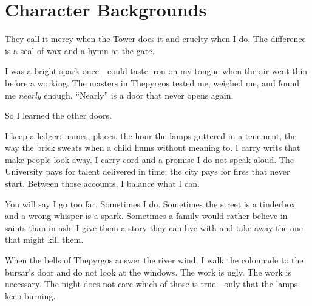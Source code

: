 \chapter{Character Backgrounds}
\label{ch:backgrounds}

\begin{tcolorbox}[colback=black!3!white,colframe=black!60!white,title={From the journal of a Thepyrgosi Witch Hunter},fonttitle=\bfseries]
They call it mercy when the Tower does it and cruelty when I do. The difference is a seal of wax and a hymn at the gate.

I was a bright spark once—could taste iron on my tongue when the air went thin before a working. The masters in Thepyrgos tested me, weighed me, and found me \emph{nearly} enough. ``Nearly'' is a door that never opens again.

So I learned the other doors.

I keep a ledger: names, places, the hour the lamps guttered in a tenement, the way the brick sweats when a child hums without meaning to. I carry writs that make people look away. I carry cord and a promise I do not speak aloud. The University pays for talent delivered in time; the city pays for fires that never start. Between those accounts, I balance what I can.

You will say I go too far. Sometimes I do. Sometimes the street is a tinderbox and a wrong whisper is a spark. Sometimes a family would rather believe in saints than in ash. I give them a story they can live with and take away the one that might kill them.

When the bells of Thepyrgos answer the river wind, I walk the colonnade to the bursar’s door and do not look at the windows. The work is ugly. The work is necessary. The night does not care which of those is true—only that the lamps keep burning.
\end{tcolorbox}

